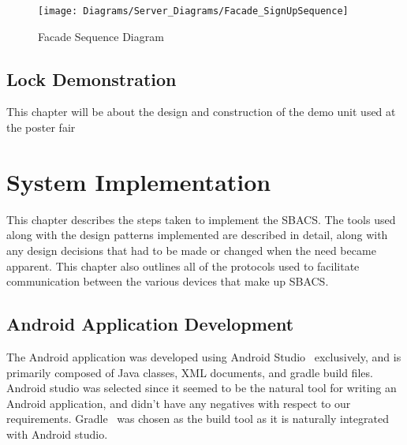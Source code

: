 \documentclass[12pt]{report}
\let\Oldsection\section
\renewcommand{\section}{\FloatBarrier\Oldsection}
\begin{document}
\begin{figure}
    \texttt{[image: Diagrams/Server\_Diagrams/Facade\_SignUpSequence]}
    \caption{Facade Sequence Diagram}
    \label{fig:facade-signup}
\end{figure}




\section{Lock Demonstration} \label{lock-demonstration}

This chapter will be about the design and construction of the demo unit used at the poster fair


\chapter{System Implementation} \label{system-implementation}

This chapter describes the steps taken to implement the SBACS. The tools used along with the design patterns implemented
are described in detail, along with any design decisions that had to be made or changed when the need became apparent.
This chapter also outlines all of the protocols used to facilitate communication between the various devices that make
up SBACS.


\section{Android Application Development} \label{android-application-development}

The Android application was developed using Android Studio~\autocite{ANDROIDSTUDIO} exclusively, and is primarily composed of Java classes, XML
documents, and gradle build files. Android studio was selected since it seemed to be the natural tool for writing an
Android application, and didn't have any negatives with respect to our requirements. Gradle~\autocite{GRADLE} was chosen as the build
tool as it is naturally integrated with Android studio.
\end{document}
